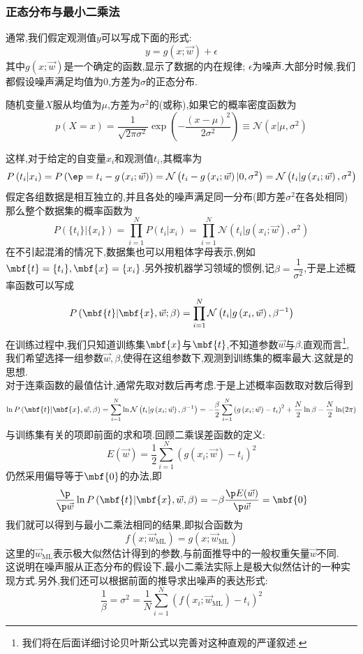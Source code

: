 \documentclass{ctexart}
\begin{document}
\subsubsection{正态分布与最小二乘法}
通常,我们假定观测值$y$可以写成下面的形式:
\[y=g(x;\vec{w})+\epsilon\]
其中$g(x;\vec{w})$是一个确定的函数,显示了数据的内在规律; $\epsilon$为噪声.大部分时候,我们都假设噪声满足均值为$0$,方差为$\sigma$的正态分布.
\begin{definition}[正态分布]
    随机变量$X$服从均值为$\mu$,方差为$\sigma^2$的(或称),如果它的概率密度函数为
    \[p(X=x)=\dfrac{1}{\sqrt{2\pi\sigma^2}}\exp\left(-\dfrac{(x-\mu)^2}{2\sigma^2}\right)\equiv\mathcal{N}\left(x|\mu,\sigma^2\right)\]
\end{definition}
这样,对于给定的自变量$x_i$和观测值$t_i$,其概率为
\[P\left(t_i|x_i\right)=P\left(\ep=t_i-g\left(x_i;\vec{w}\right)\right)=\mathcal{N}\left(t_i-g\left(x_i;\vec{w}\right)|0,\sigma^2\right)=\mathcal{N}\left(t_i|g\left(x_i;\vec{w}\right),\sigma^2\right)\]
假定各组数据是相互独立的,并且各处的噪声满足同一分布(即方差$\sigma^2$在各处相同)那么整个数据集的概率函数为
\[P\left(\{t_i\}| \{x_i\}\right)=\prod_{i=1}^{N}P\left(t_i|x_i\right)=\prod_{i=1}^{N}\mathcal{N}\left(t_i|g\left(x_i;\vec{w}\right),\sigma^2\right)\]
在不引起混淆的情况下,数据集也可以用粗体字母表示,例如$\mbf{t}=\{t_i\},\mbf{x}=\{x_i\}$.另外按机器学习领域的惯例,记$\beta=\dfrac{1}{\sigma^2}$,于是上述概率函数可以写成
\[P\left(\mbf{t}|\mbf{x},\vec{w};\beta\right)=\prod_{i=1}^{N}\mathcal{N}\left(t_i|g\left(x_i,\vec{w}\right),\beta^{-1}\right)\]
在训练过程中,我们只知道训练集$\mbf{x}$与$\mbf{t}$,不知道参数$\vec{w}$与$\beta$.直观而言\footnote{我们将在后面详细讨论贝叶斯公式以完善对这种直观的严谨叙述.},我们希望选择一组参数$\vec{w},\beta$,使得在这组参数下,观测到训练集的概率最大.这就是的思想.\\
\indent 对于连乘函数的最值估计,通常先取对数后再考虑.于是上述概率函数取对数后得到
\[\ln P\left(\mbf{t}|\mbf{x},\vec{w},\beta\right)=\sum_{i=1}^{N}\ln\mathcal{N}\left(t_i|g\left(x_i;\vec{w}\right),\beta^{-1}\right)=-\dfrac{\beta}{2}\sum_{i=1}^{N}\left(g\left(x_i;\vec{w}\right)-t_i\right)^2+\dfrac{N}{2}\ln\beta-\dfrac{N}{2}\ln(2\pi)\]
与训练集有关的项即前面的求和项.回顾二乘误差函数的定义:
\[E(\vec{w})=\dfrac12\sum_{i=1}^{N}\left(g(x_i;\vec{w})-t_i\right)^2\]
仍然采用偏导等于$\mbf{0}$的办法,即
\[\dfrac{\p}{\p \vec{w}}\ln P\left(\mbf{t}|\mbf{x},\vec{w},\beta\right)=-\beta\dfrac{\p E(\vec{w})}{\p \vec{w}}=\mbf{0}\]
我们就可以得到与最小二乘法相同的结果,即拟合函数为
\[f\left(x;\vec{w}_{\text{ML}}\right)=g\left(x;\vec{w}_{\text{ML}}\right)\]
这里的$\vec{w}_{\text{ML}}$表示极大似然估计得到的参数,与前面推导中的一般权重矢量$\vec{w}$不同.\\
\indent 这说明在噪声服从正态分布的假设下,最小二乘法实际上是极大似然估计的一种实现方式.另外,我们还可以根据前面的推导求出噪声的表达形式:
\[\dfrac{1}{\beta}=\sigma^2=
\dfrac{1}{N}\sum_{i=1}^{N}\left(f\left(x_i;\vec{w}_{\text{ML}}\right)-t_i\right)^2\]
\end{document}
